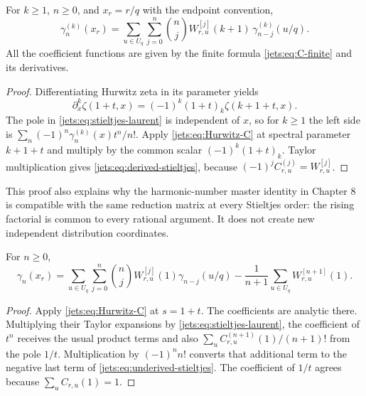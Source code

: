 \begin{theorem}\label{jets:thm:derived-stieltjes}
For $k\ge1$, $n\ge0$, and $x_r=r/q$ with the endpoint convention,
\begin{equation}\label{jets:eq:derived-stieltjes}
 \boxed{\displaystyle
 \gamma_n^{(k)}(x_r)=
 \sum_{u\in U_q}\sum_{j=0}^n\binom nj
 W_{r,u}^{[j]}(k+1)\,
 \gamma_{n-j}^{(k)}(u/q).}
\end{equation}
All the coefficient functions are given by the finite formula
\eqref{jets:eq:C-finite} and its derivatives.
\end{theorem}
\begin{proof}
Differentiating Hurwitz zeta in its parameter yields
\[
 \partial_x^k\zeta(1+t,x)=(-1)^k(1+t)_k\zeta(k+1+t,x).
\]
The pole in \eqref{jets:eq:stieltjes-laurent} is independent of $x$, so for
$k\ge1$ the left side is
$\sum_n(-1)^n\gamma_n^{(k)}(x)t^n/n!$.
Apply \eqref{jets:eq:Hurwitz-C} at spectral parameter $k+1+t$ and multiply
by the common scalar $(-1)^k(1+t)_k$. Taylor multiplication gives
\eqref{jets:eq:derived-stieltjes}, because
$(-1)^j C_{r,u}^{(j)}=W_{r,u}^{[j]}$.
\end{proof}

This proof also explains why the harmonic-number master identity in
Chapter 8 is compatible with the same reduction matrix at every
Stieltjes order: the rising factorial is common to every rational
argument. It does not create new independent distribution coordinates.

\begin{theorem}\label{jets:thm:underived}
For $n\ge0$,
\begin{equation}\label{jets:eq:underived-stieltjes}
 \boxed{\displaystyle
 \gamma_n(x_r)=
 \sum_{u\in U_q}\sum_{j=0}^n\binom nj
 W_{r,u}^{[j]}(1)\gamma_{n-j}(u/q)
 -\frac1{n+1}\sum_{u\in U_q}W_{r,u}^{[n+1]}(1).}
\end{equation}
\end{theorem}
\begin{proof}
Apply \eqref{jets:eq:Hurwitz-C} at $s=1+t$. The coefficients are analytic
there. Multiplying their Taylor expansions by
\eqref{jets:eq:stieltjes-laurent}, the coefficient of $t^n$ receives the
usual product terms and also
$\sum_u C_{r,u}^{(n+1)}(1)/(n+1)!$ from the pole $1/t$.
Multiplication by $(-1)^n n!$ converts that additional term to the
negative last term of \eqref{jets:eq:underived-stieltjes}. The coefficient
of $1/t$ agrees because $\sum_u C_{r,u}(1)=1$.
\end{proof}


